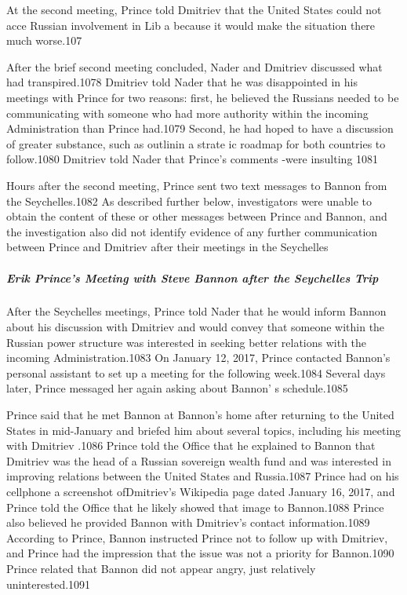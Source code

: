 At the second meeting, Prince told Dmitriev that the United States could not acce Russian involvement in Lib a because it would make the situation there much worse.107

After the brief second meeting concluded, Nader and Dmitriev discussed what had transpired.1078 Dmitriev told Nader that he was disappointed in his meetings with Prince for two reasons: first, he believed the Russians needed to be communicating with someone who had more authority within the incoming Administration than Prince had.1079 Second, he had hoped to have a  discussion of greater substance, such as outlinin a  strate ic roadmap for both countries to follow.1080 Dmitriev told Nader that Prince's comments -were insulting 1081

Hours after the second meeting,  Prince sent two text messages to Bannon from the Seychelles.1082 As described further below, investigators were unable to obtain the content of these or other messages between Prince and Bannon, and the investigation also did not identify evidence of any further communication between Prince and Dmitriev after their meetings in the Seychelles

\subparagraph{Erik Prince's Meeting with Steve Bannon after the Seychelles Trip}

After the Seychelles meetings, Prince told Nader that he would inform Bannon about his discussion with Dmitriev and would convey that someone within the Russian power structure was interested in seeking better relations with the incoming Administration.1083 On January 12, 2017, Prince contacted Bannon's personal assistant to set up a  meeting for the following week.1084 Several days later, Prince messaged her again asking about Bannon' s schedule.1085

Prince said that he met Bannon at Bannon's home after returning to the United States in mid-January and briefed him about several topics, including his meeting with Dmitriev .1086 Prince told the Office that he explained to Bannon that Dmitriev was the head of a  Russian sovereign wealth fund and was interested in improving relations between the United States and Russia.1087 Prince had on his cellphone a  screenshot ofDmitriev's Wikipedia page  dated January 16, 2017, and Prince told the Office that he likely showed that image to Bannon.1088 Prince also believed he provided Bannon with Dmitriev's contact information.1089 According to Prince, Bannon instructed Prince not to follow up with Dmitriev,  and Prince had the impression that the issue was not a priority for Bannon.1090 Prince related that Bannon did not appear angry, just relatively uninterested.1091


